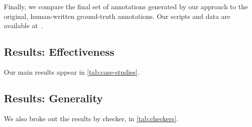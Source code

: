 Finally, we compare the final set of annotations generated by our approach to the original,
human-written ground-truth annotations. Our scripts and data are available
at~.

\subsection{Results: Effectiveness}
\label{sec:results}

Our main results appear in \cref{tab:case-studies}. 

\subsection{Results: Generality}
\label{sec:by-checker}



We also broke out the results by checker, in \cref{tab:checkers}. 

